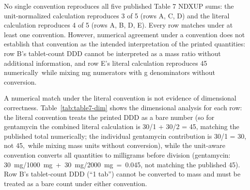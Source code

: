 \documentclass[a4paper]{elsarticle}
\begin{document}
No single convention reproduces all five published Table 7 NDXUP sums: the unit-normalized calculation reproduces 3 of 5 (rows A, C, D) and the literal calculation reproduces 4 of 5 (rows A, B, D, E). Every row matches under at least one convention. However, numerical agreement under a convention does not establish that convention as the intended interpretation of the printed quantities: row B's tablet-count DDD cannot be interpreted as a mass ratio without additional information, and row E's literal calculation reproduces 45 numerically~while mixing mg numerators with g denominators without conversion.

A numerical match under the literal convention is not evidence of dimensional correctness. Table~\ref{tab:table7-dim} shows the dimensional analysis for each row: the literal convention treats the printed DDD as a bare number (so for gentamycin the combined literal calculation is 30/1 + 30/2 = 45, matching the published total numerically; the individual gentamycin contribution is 30/1 = 30, not 45,~while mixing mass units without conversion), while the unit-aware convention converts all quantities to milligrams before division (gentamycin: 30~mg/1000~mg~+~30~mg/2000~mg~=~0.045, not matching the published 45). Row B's tablet-count DDD (``1 tab'') cannot be converted to mass and must be treated as a bare count under either convention.

\begin{table}[htbp]
\centering\small
\caption{Dimensional analysis of the 5 published Table 7 NDXUP sums. Dim.\ valid indicates whether the calculation respects unit compatibility (dosage and DDD expressed in compatible units before division). Literal calculation divides printed numbers as they appear; unit-normalized calculation converts all quantities to milligrams where the units are compatible.}
\label{tab:table7-dim}
\end{table}
\end{document}

